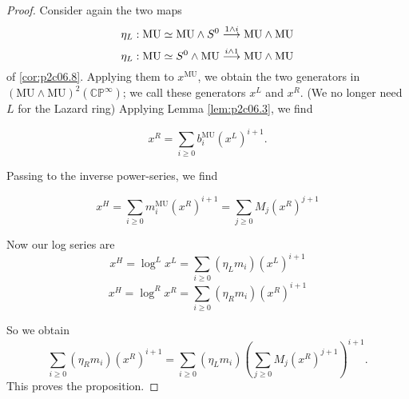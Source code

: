 \documentclass[../main]{subfiles}
\begin{document}
\begin{proof}
Consider again the two maps $$\eta_L : \mathrm{MU} \simeq \mathrm{MU} \wedge S^0 \overset{1 \wedge i}{\longrightarrow} \mathrm{MU} \wedge \mathrm{MU}$$ 
$$\eta_L : \mathrm{MU} \simeq S^0 \wedge \mathrm{MU} \overset{i \wedge 1}{\longrightarrow} \mathrm{MU} \wedge \mathrm{MU}$$ 
of \eqref{cor:p2c06.8}. Applying them to $x^{\mathrm{MU}}$, we obtain the two generators in $(\mathrm{MU} \wedge \mathrm {MU})^2 (\mathbb {CP}^\infty)$; we call these generators $x^L$ and $x^R$. (We no longer need $L$ for the Lazard ring) Applying Lemma \ref{lem:p2c06.3}, we find

\begin{equation}
\label{eqn:p2c09.5}
\tag{9.5}
x^R = \sum_{i \ge 0} b_i^{\mathrm{MU}} (x^L)^{i + 1}.
\end{equation}

Passing to the inverse power-series, we find

\begin{equation}
\label{eqn:p2c09.6}
\tag{9.6}
x^H = \sum_{i \ge 0} m_i^{\mathrm{MU}} (x^R)^{i + 1} = \sum_{j \ge 0} M_j (x^R)^{j + 1}
\end{equation}

Now our log series are
$$x^H = \log^L x^L = \sum_{i \ge 0} (\eta_L m_i) (x^L)^{i + 1}$$
$$x^H = \log^R x^R = \sum_{i \ge 0} (\eta_R m_i) (x^R)^{i + 1}$$

So we obtain $$\sum_{i \ge 0} (\eta_R m_i) (x^R)^{i + 1} = \sum_{i \ge 0} (\eta_L m_i) \left(\sum_{j \ge 0} M_j (x^R)^{j + 1}\right)^{i + 1}.$$
This proves the proposition.
\end{proof}
\end{document}
